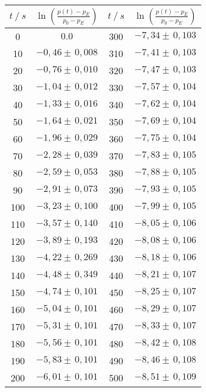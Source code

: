 \begin{table}[H]
  \centering
  \begin{tabular}{c|c||c|c}
    {$t \:/\: \si{s}$} & { $\ln\left(\frac{p(t) - p_E}{p_0 - p_E}\right)$ } & {$t \:/\: \si{s}$} & {$\ln\left(\frac{p(t) - p_E}{p_0 - p_E}\right)$}\\
  \midrule
  0    & $ 0.0                  $ &  300  & $ -7,34  \pm \,  0,103 $ \\ 
  10   & $ -0,46  \pm \,  0,008 $ &  310  & $ -7,41  \pm \,  0,103 $ \\
  20   & $ -0,76  \pm \,  0,010 $ &  320  & $ -7,47  \pm \,  0,103 $ \\
  30   & $ -1,04  \pm \,  0,012 $ &  330  & $ -7,57  \pm \,  0,104 $ \\
  40   & $ -1,33  \pm \,  0,016 $ &  340  & $ -7,62  \pm \,  0,104 $ \\
  50   & $ -1,64  \pm \,  0,021 $ &  350  & $ -7,69  \pm \,  0,104 $ \\
  60   & $ -1,96  \pm \,  0,029 $ &  360  & $ -7,75  \pm \,  0,104 $ \\
  70   & $ -2,28  \pm \,  0,039 $ &  370  & $ -7,83  \pm \,  0,105 $ \\
  80   & $ -2,59  \pm \,  0,053 $ &  380  & $ -7,88  \pm \,  0,105 $ \\
  90   & $ -2,91  \pm \,  0,073 $ &  390  & $ -7,93  \pm \,  0,105 $ \\
  100  & $ -3,23  \pm \,  0,100 $ &  400  & $ -7,99  \pm \,  0,105 $ \\
  110  & $ -3,57  \pm \,  0,140 $ &  410  & $ -8,05  \pm \,  0,106 $ \\
  120  & $ -3,89  \pm \,  0,193 $ &  420  & $ -8,08  \pm \,  0,106 $ \\
  130  & $ -4,22  \pm \,  0,269 $ &  430  & $ -8,18  \pm \,  0,106 $ \\
  140  & $ -4,48  \pm \,  0,349 $ &  440  & $ -8,21  \pm \,  0,107 $ \\
  150  & $ -4,74  \pm \,  0,101 $ &  450  & $ -8,25  \pm \,  0,107 $ \\
  160  & $ -5,04  \pm \,  0,101 $ &  460  & $ -8,29  \pm \,  0,107 $ \\
  170  & $ -5,31  \pm \,  0,101 $ &  470  & $ -8,33  \pm \,  0,107 $ \\
  180  & $ -5,56  \pm \,  0,101 $ &  480  & $ -8,42  \pm \,  0,108 $ \\
  190  & $ -5,83  \pm \,  0,101 $ &  490  & $ -8,46  \pm \,  0,108 $ \\
  200  & $ -6,01  \pm \,  0,101 $ &  500  & $ -8,51  \pm \,  0,109 $ \\

\end{tabular}
\end{table}
